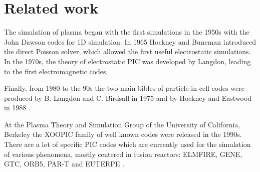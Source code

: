 \section{Related work}

The simulation of plasma began with the first simulations in the 1950s with the
John Dawson codes for 1D simulation. In 1965 Hockney and Buneman introduced the
direct Poisson solver, which allowed the first useful electrostatic simulations.
In the 1970s, the theory of electrostatic PIC was developed by Langdon, leading
to the first electromagnetic codes.

Finally, from 1980 to the 90s the two main bibles of particle-in-cell codes were
produced  by B. Langdon and C. Birdsall in 1975 \cite{birdsall} and by Hockney
and Eastwood in 1988 \cite{hockney}.

At the Plasma Theory and Simulation Group of the University of California,
Berkeley the XOOPIC \cite{xoopic} family of well known codes were released in
the 1990s. There are a lot of specific PIC codes which are currently used for 
the simulation of various phenomena, mostly centered in fusion reactors: 
ELMFIRE, GENE, GTC, ORB5, PAR-T and EUTERPE \cite{euterpe}.


